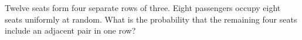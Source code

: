 Twelve seats form four separate rows of three. Eight passengers occupy eight seats uniformly at random. What is the probability that the remaining four seats include an adjacent pair in one row?
